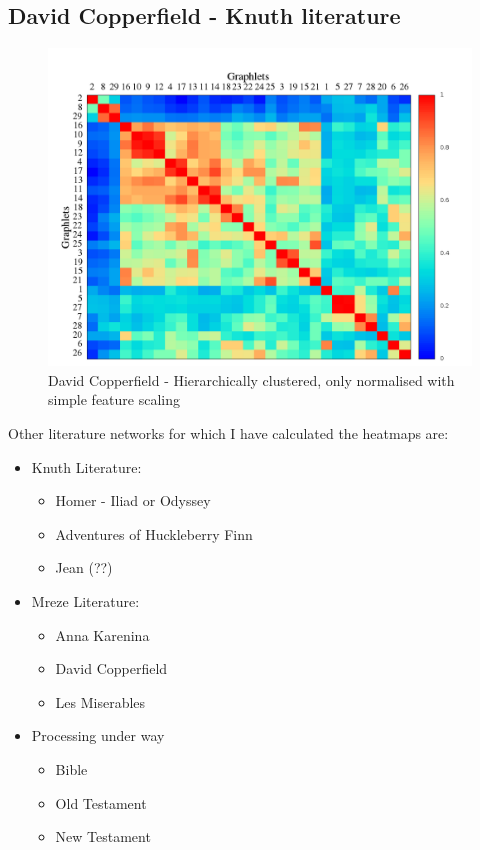 \documentclass[11pt,a4paper,oneside]{report}
\begin{document}
\subsection*{David Copperfield - Knuth literature}

\begin{figure}[H]
  \centering
\includegraphics[scale=0.4]
{../code/final_results_norm1/knuth_literature/david/heatmap_pearsons_hclust_david.png}
\caption{David Copperfield - Hierarchically clustered, only normalised with simple feature scaling}
\label{fig:anna-knuth}
\end{figure}


Other literature networks for which I have calculated the heatmaps are:
\begin{itemize}
 \item Knuth Literature:
 \begin{itemize}
    \item Homer - Iliad or Odyssey
    \item Adventures of Huckleberry Finn
    \item Jean (??)
  \end{itemize}
 \item Mreze Literature:
 \begin{itemize}
    \item Anna Karenina
    \item David Copperfield
    \item Les Miserables
  \end{itemize}
  \item Processing under way
  \begin{itemize}
  \item Bible
    \item Old Testament
    \item New Testament
  \end{itemize}
  \end{itemize}
\end{document}
